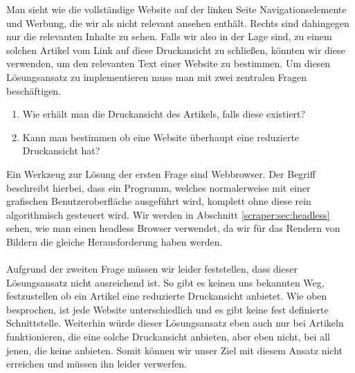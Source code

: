 Man sieht wie die vollständige Website auf der linken Seite Navigationselemente und Werbung, die wir als nicht relevant ansehen enthält. Rechts sind dahingegen nur die relevanten Inhalte zu sehen. Falls wir also in der Lage sind, zu einem solchen Artikel vom Link auf diese Druckansicht zu schließen, könnten wir diese verwenden, um den relevanten Text einer Website zu bestimmen. Um diesen Lösungsansatz zu implementieren muss man mit zwei zentralen Fragen beschäftigen.
\begin{enumerate}
	\item Wie erhält man die Druckansicht des Artikels, falls diese existiert?
	\item Kann man bestimmen ob eine Website überhaupt eine reduzierte Druckansicht hat? 
\end{enumerate}
Ein Werkzeug zur Lösung der ersten Frage sind  Webbrowser. Der Begriff  beschreibt hierbei, dass ein Programm, welches normalerweise mit einer grafischen Benutzeroberfläche ausgeführt wird, komplett ohne diese rein algorithmisch gesteuert wird. Wir werden in Abschnitt \ref{scraper:sec:headless} sehen, wie man einen headless Browser verwendet, da wir für das Rendern von Bildern die gleiche Herausforderung haben werden. \\ \\
Aufgrund der zweiten Frage müssen wir leider feststellen, dass dieser Lösungsansatz nicht ausreichend ist. So gibt es keinen uns bekannten Weg, festzustellen ob ein Artikel eine reduzierte Druckansicht anbietet. Wie oben besprochen, ist jede Website unterschiedlich und es gibt keine fest definierte Schnittstelle. Weiterhin würde dieser Lösungsansatz eben auch nur bei Artikeln funktionieren, die eine solche Druckansicht anbieten, aber eben nicht, bei all jenen, die keine anbieten. Somit können wir unser Ziel mit diesem Ansatz nicht erreichen und müssen ihn leider verwerfen.


